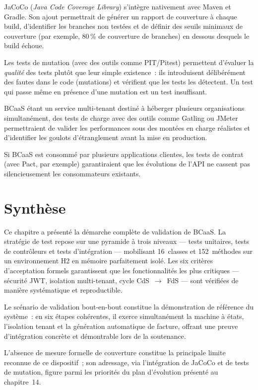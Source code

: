 \begin{description}[leftmargin=0.5cm]
  \item[\textbf{Intégration de JaCoCo}]
    JaCoCo (\textit{Java Code Coverage Library}) s'intègre nativement avec Maven et
    Gradle. Son ajout permettrait de générer un rapport de couverture à chaque build,
    d'identifier les branches non testées et de définir des seuils minimaux de couverture
    (par exemple, 80\,\% de couverture de branches) en dessous desquels le build échoue.

  \item[\textbf{Tests de mutation}]
    Les tests de mutation (avec des outils comme PIT/Pitest) permettent d'évaluer la
    \textit{qualité} des tests plutôt que leur simple existence~: ils introduisent
    délibérément des fautes dans le code (mutations) et vérifient que les tests les
    détectent. Un test qui passe même en présence d'une mutation est un test insuffisant.

  \item[\textbf{Tests de charge}]
    BCaaS étant un service multi-tenant destiné à héberger plusieurs organisations
    simultanément, des tests de charge avec des outils comme Gatling ou JMeter permettraient
    de valider les performances sous des montées en charge réalistes et d'identifier les
    goulots d'étranglement avant la mise en production.

  \item[\textbf{Tests de contrat (Consumer-Driven Contract Testing)}]
    Si BCaaS est consommé par plusieurs applications clientes, les tests de contrat
    (avec Pact, par exemple) garantiraient que les évolutions de l'API ne cassent pas
    silencieusement les consommateurs existants.
\end{description}

\section*{Synthèse}
\label{sec:synthese-chap12}

Ce chapitre a présenté la démarche complète de validation de BCaaS. La stratégie de test
repose sur une pyramide à trois niveaux --- tests unitaires, tests de contrôleurs et tests
d'intégration --- mobilisant 16~classes et 152~méthodes sur un environnement H2 en mémoire
parfaitement isolé. Les six critères d'acceptation formels garantissent que les
fonctionnalités les plus critiques --- sécurité JWT, isolation multi-tenant, cycle
CdS~$\rightarrow$~FdS --- sont vérifiées de manière systématique et reproductible.

Le scénario de validation bout-en-bout constitue la démonstration de référence du système~:
en six étapes cohérentes, il exerce simultanément la machine à états, l'isolation tenant
et la génération automatique de facture, offrant une preuve d'intégration concrète et
démontrable lors de la soutenance.

L'absence de mesure formelle de couverture constitue la principale limite reconnue de ce
dispositif~; son adressage, via l'intégration de JaCoCo et de tests de mutation, figure
parmi les priorités du plan d'évolution présenté au chapitre~14.